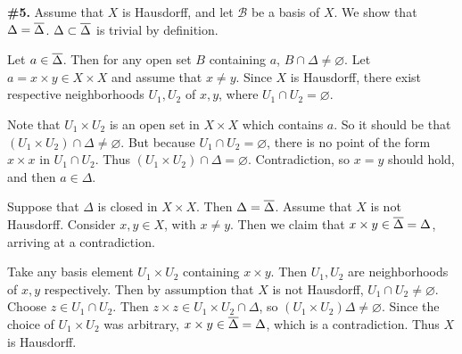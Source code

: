 \documentclass[a4paper,11pt]{article}
\newcommand{\B}{\mathcal{B}}
\begin{document}
\begin{minipage}[t][270mm]{90mm}
    {\bfseries \large \#5.} Assume that \(X\) is Hausdorff, and let \(\B\) be a basis of \(X\). We show that \(\Delta = \overline{\Delta}\). \(\Delta \subset \overline{\Delta}\) is trivial by definition.

    \bigskip

    Let \(a \in \overline{\Delta}\). Then for any open set \(B\) containing \(a\), \(B \cap \Delta \neq \varnothing\). Let \(a = x \times y \in X\times X\) and assume that \(x \neq y\). Since \(X\) is Hausdorff, there exist respective neighborhoods \(U_1, U_2\) of \(x, y\), where \(U_1 \cap U_2 = \varnothing\).

    Note that \(U_1 \times U_2\) is an open set in \(X \times X\) which contains \(a\). So it should be that \((U_1\times U_2) \cap \Delta \neq \varnothing\). But because \(U_1 \cap U_2 = \varnothing\), there is no point of the form \(x \times x\) in \(U_1 \cap U_2\). Thus \((U_1 \times U_2) \cap \Delta = \varnothing\). Contradiction, so \(x = y\) should hold, and then \(a \in \Delta\).

    \bigskip

    Suppose that \(\Delta\) is closed in \(X \times X\). Then \(\Delta = \overline{\Delta}\). Assume that \(X\) is not Hausdorff. Consider \(x, y \in X\), with \(x \neq y\). Then we claim that \(x \times y \in \overline{\Delta} = \Delta\), arriving at a contradiction.

    Take any basis element \(U_1 \times U_2\) containing \(x \times y\). Then \(U_1, U_2\) are neighborhoods of \(x, y\) respectively. Then by assumption that \(X\) is not Hausdorff, \(U_1 \cap U_2 \neq \varnothing\). Choose \(z \in U_1 \cap U_2\). Then \(z\times z \in U_1 \times U_2 \cap \Delta\), so \((U_1 \times U_2) \Delta \neq \varnothing\). Since the choice of \(U_1 \times U_2\) was arbitrary, \(x\times y \in \overline{\Delta} = \Delta\), which is a contradiction. Thus \(X\) is Hausdorff.
\end{minipage}
{\color{gray}\vline}
\begin{minipage}[t][270mm]{90mm}
    \phantom{?}
\end{minipage}

\newpage

\phantom{?}
\vspace{5mm}
\end{document}
